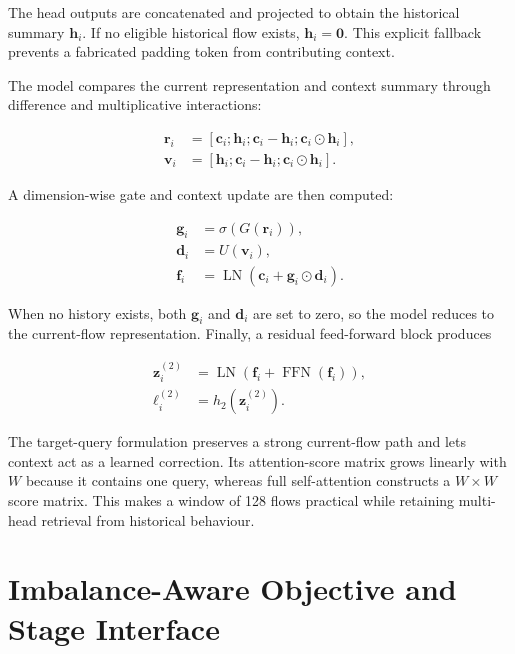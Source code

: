 \documentclass[11pt,fleqn]{report}
\begin{document}
The head outputs are concatenated and projected to obtain the historical summary $\mathbf{h}_i$. If no eligible historical flow exists, $\mathbf{h}_i=\mathbf{0}$. This explicit fallback prevents a fabricated padding token from contributing context.

The model compares the current representation and context summary through difference and multiplicative interactions:

\begin{align}
    \mathbf{r}_i
    &=[\mathbf{c}_i;\mathbf{h}_i;
       \mathbf{c}_i-\mathbf{h}_i;
       \mathbf{c}_i\odot\mathbf{h}_i],\\
    \mathbf{v}_i
    &=[\mathbf{h}_i;
       \mathbf{c}_i-\mathbf{h}_i;
       \mathbf{c}_i\odot\mathbf{h}_i].
    \label{eq:target_context_interactions}
\end{align}

A dimension-wise gate and context update are then computed:

\begin{align}
    \mathbf{g}_i&=\sigma(G(\mathbf{r}_i)),\\
    \mathbf{d}_i&=U(\mathbf{v}_i),\\
    \mathbf{f}_i&=\operatorname{LN}
      \left(\mathbf{c}_i+\mathbf{g}_i\odot\mathbf{d}_i\right).
    \label{eq:gated_context_update}
\end{align}

When no history exists, both $\mathbf{g}_i$ and $\mathbf{d}_i$ are set to zero, so the model reduces to the current-flow representation. Finally, a residual feed-forward block produces

\begin{align}
    \mathbf{z}^{(2)}_i
    &=\operatorname{LN}
      \left(
        \mathbf{f}_i+\operatorname{FFN}(\mathbf{f}_i)
      \right),\\
    \boldsymbol{\ell}^{(2)}_i
    &=h_2(\mathbf{z}^{(2)}_i).
    \label{eq:stage2_output}
\end{align}

The target-query formulation preserves a strong current-flow path and lets context act as a learned correction. Its attention-score matrix grows linearly with $W$ because it contains one query, whereas full self-attention constructs a $W\times W$ score matrix. This makes a window of 128 flows practical while retaining multi-head retrieval from historical behaviour.
\section{Imbalance-Aware Objective and Stage Interface}
\label{subsec:method_training}
\end{document}
